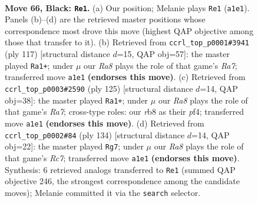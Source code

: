 \documentclass[11pt]{article}
\begin{document}
\clearpage

\begin{figure}[p]\centering
\begin{subfigure}{0.46\textwidth}\centering
\resizebox{\linewidth}{!}{%
\newchessgame
\chessboard[
  setfen={1R6/R4pk1/4p3/8/P3P3/5P2/6K1/r7 b - - 24 66},
  showmover=false,
  pgfstyle=straightmove, color=movearrow, markmove={a1-e1}
]}
\caption{}
\end{subfigure}\hfill
\begin{subfigure}{0.46\textwidth}\centering
\resizebox{\linewidth}{!}{%
\newchessgame
\chessboard[
  setfen={8/8/R4pk1/6p1/P5P1/7P/r7/6K1 b - - 8 59},
  showmover=false,
  pgfstyle=straightmove, color=movearrow, markmove={a2-a1}
]}
\caption{}
\end{subfigure}
\\[4pt]
\begin{subfigure}{0.46\textwidth}\centering
\resizebox{\linewidth}{!}{%
\newchessgame
\chessboard[
  setfen={8/R5p1/8/1P6/P2k1P2/3p4/r7/4K3 b - - 0 63},
  showmover=false,
  pgfstyle=straightmove, color=movearrow, markmove={a2-a1}
]}
\caption{}
\end{subfigure}\hfill
\begin{subfigure}{0.46\textwidth}\centering
\resizebox{\linewidth}{!}{%
\newchessgame
\chessboard[
  setfen={3k4/2R5/2p2r1p/6p1/6P1/5P2/5K2/8 w - - 12 68},
  showmover=false,
  pgfstyle=straightmove, color=movearrow, markmove={c7-g7}
]}
\caption{}
\end{subfigure}
\caption{\textbf{Move 66, Black: \texttt{Re1}.} (a) Our position; Melanie plays \texttt{Re1} (\texttt{a1e1}). Panels (b)--(d) are the retrieved master positions whose correspondence most drove this move (highest QAP objective among those that transfer to it). (b) Retrieved from \texttt{ccrl\_top\_p0001\#3941} (ply 117) [structural distance $d$=15, QAP obj=57]: the master played \texttt{Ra1+}; under $\mu$ our \emph{Ra8} plays the role of that game's \emph{Ra7}; transferred move \texttt{a1e1} \textbf{(endorses this move)}. (c) Retrieved from \texttt{ccrl\_top\_p0003\#2590} (ply 125) [structural distance $d$=14, QAP obj=38]: the master played \texttt{Ra1+}; under $\mu$ our \emph{Ra8} plays the role of that game's \emph{Ra7}; cross-type roles: our \emph{r}b8 as their \emph{p}f4; transferred move \texttt{a1e1} \textbf{(endorses this move)}. (d) Retrieved from \texttt{ccrl\_top\_p0002\#84} (ply 134) [structural distance $d$=14, QAP obj=22]: the master played \texttt{Rg7}; under $\mu$ our \emph{Ra8} plays the role of that game's \emph{Rc7}; transferred move \texttt{a1e1} \textbf{(endorses this move)}. Synthesis: 6 retrieved analogs transferred to \texttt{Re1} (summed QAP objective 246, the strongest correspondence among the candidate moves); Melanie committed it via the \texttt{search} selector.}
\label{fig:thought-m131}
\end{figure}
\end{document}
